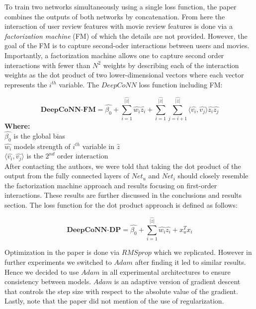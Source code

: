 \documentclass[10pt, twocolumn, letterpaper]{article}
\begin{document}
To train two networks simultaneously using a single loss function, the paper combines the outputs of both networks by concatenation. From here the interaction of user review features with movie review features is done via a \textit{factorization machine} (FM) of which the details are not provided. However, the goal of the FM is to capture second-oder interactions between users and movies. Importantly, a factorization machine allows one to capture second order interactions with fewer than $N^2$ weights by describing each of the interaction weights as the dot product of two lower-dimensional vectors where each vector represents the $i^{th}$ variable. The $DeepCoNN$ loss function including FM:

$$
\textbf{DeepCoNN-FM} = \hat{\beta_{0}} + \sum_{i=1}^{\hat{|z|}}\hat{w_{i}}\hat{z_{i}} + \sum_{i=1}^{\hat{|z|}}
\sum_{j=i+1}^{\hat{|z|}} \langle \hat{v_i}, \hat{v_j} \rangle \hat{z_i}\hat{z_j}
$$
\textbf{Where:}\\
$\hat{\beta_0}$ is the global bias\\
$\hat{w_i}$ models strength of $i^{th}$ variable in $\hat{z}$\\
$\langle\hat{v_i}, \hat{v_j} \rangle$ is the $2^{nd}$ order interaction\\



After contacting the authors, we were told that taking the dot product of the output from the fully connected layers of $Net_{u}$ and $Net_{i}$ should closely resemble the factorization machine approach and results focusing on first-order interactions. These results are further discussed in the conclusions and results section. The loss function for the dot product approach is defined as follows:

$$
\textbf{DeepCoNN-DP} = \hat{\beta_{0}} + \sum_{i=1}^{\hat{|z|}}\hat{w_{i}}\hat{z_{i}} + x^{T}_{u}x_{i}
$$

Optimization in the paper is done via $RMSprop$ which we replicated. However in further experiments we switched to $Adam$ after finding it led to similar results. Hence we decided to use $Adam$ in all experimental architectures to ensure consistency between models. $Adam$ is an adaptive version of gradient descent that controls the step size with respect to the absolute value of the gradient. Lastly, note that the paper did not mention of the use of regularization.
\end{document}
